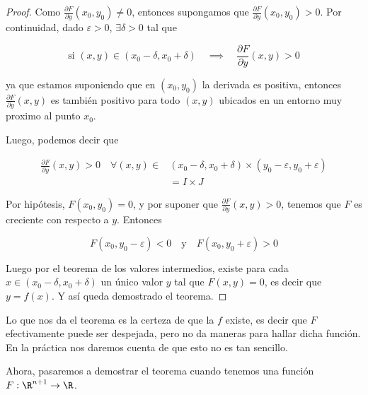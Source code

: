 \begin{proof}
    Como $\frac{\partial F}{\partial y} (x_0, y_0) \neq 0$, entonces supongamos que $\frac{\partial F}{\partial y} (x_0, y_0) > 0$. Por continuidad, dado $\varepsilon > 0$, $\exists \delta > 0$ tal que
    
    \[
    \text{si $\displaystyle (x,y) \in (x_0 - \delta, x_0 + \delta)$} \quad \implies \quad \dfrac{\partial F}{\partial y}(x,y) > 0
    \]
    
    \noindent ya que estamos suponiendo que en $(x_0, y_0)$ la derivada es positiva, entonces $\frac{\partial F}{\partial y} (x, y)$ es también positivo para todo $(x,y)$ ubicados en un entorno muy proximo al punto $x_0$.
    
    Luego, podemos decir que
    
    \begin{align*}
        \frac{\partial F}{\partial y} (x, y) > 0 \quad \forall (x,y) \in &(x_0 - \delta, x_0 + \delta) \times (y_0 - \varepsilon, y_0 + \varepsilon) \\
            &= I \times J
    \end{align*}
    
    Por hipótesis, $F(x_0, y_0) = 0$, y por suponer que $\frac{\partial F}{\partial y} (x, y) > 0$, tenemos que $F$ es creciente con respecto a $y$. Entonces
    
    \[
    F(x_0, y_0 - \varepsilon) < 0 \quad \text{y} \quad F(x_0, y_0 + \varepsilon) > 0
    \]
    
    Luego por el teorema de los valores intermedios, existe para cada $x \in (x_0 - \delta, x_0 + \delta)$ un único valor $y$ tal que $F(x,y) = 0$, es decir que $y = f(x)$. Y así queda demostrado el teorema.
\end{proof}

\begin{aco}
    Lo que nos da el teorema es la certeza de que la $f$ existe, es decir que $F$ efectivamente puede ser despejada, pero no da maneras para hallar dicha función. En la práctica nos daremos cuenta de que esto no es tan sencillo.
\end{aco}

Ahora, pasaremos a demostrar el teorema cuando tenemos una función $F: \R^{n+1} \rightarrow \R$.


